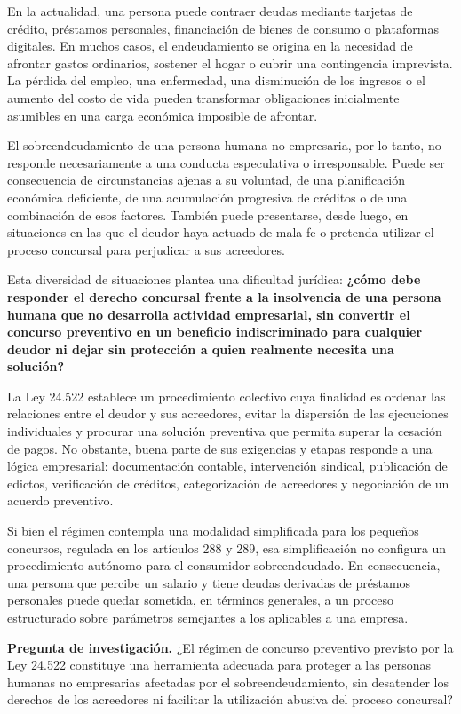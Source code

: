 \documentclass[12pt,oneside]{book}
\begin{document}
En la actualidad, una persona puede contraer deudas mediante tarjetas de crédito, préstamos personales, financiación de bienes de consumo o plataformas digitales. En muchos casos, el endeudamiento se origina en la necesidad de afrontar gastos ordinarios, sostener el hogar o cubrir una contingencia imprevista. La pérdida del empleo, una enfermedad, una disminución de los ingresos o el aumento del costo de vida pueden transformar obligaciones inicialmente asumibles en una carga económica imposible de afrontar.

El sobreendeudamiento de una persona humana no empresaria, por lo tanto, no responde necesariamente a una conducta especulativa o irresponsable. Puede ser consecuencia de circunstancias ajenas a su voluntad, de una planificación económica deficiente, de una acumulación progresiva de créditos o de una combinación de esos factores. También puede presentarse, desde luego, en situaciones en las que el deudor haya actuado de mala fe o pretenda utilizar el proceso concursal para perjudicar a sus acreedores.

Esta diversidad de situaciones plantea una dificultad jurídica: \textbf{¿cómo debe responder el derecho concursal frente a la insolvencia de una persona humana que no desarrolla actividad empresarial, sin convertir el concurso preventivo en un beneficio indiscriminado para cualquier deudor ni dejar sin protección a quien realmente necesita una solución?}

La Ley 24.522 establece un procedimiento colectivo cuya finalidad es ordenar las relaciones entre el deudor y sus acreedores, evitar la dispersión de las ejecuciones individuales y procurar una solución preventiva que permita superar la cesación de pagos. No obstante, buena parte de sus exigencias y etapas responde a una lógica empresarial: documentación contable, intervención sindical, publicación de edictos, verificación de créditos, categorización de acreedores y negociación de un acuerdo preventivo.

Si bien el régimen contempla una modalidad simplificada para los pequeños concursos, regulada en los artículos 288 y 289, esa simplificación no configura un procedimiento autónomo para el consumidor sobreendeudado. En consecuencia, una persona que percibe un salario y tiene deudas derivadas de préstamos personales puede quedar sometida, en términos generales, a un proceso estructurado sobre parámetros semejantes a los aplicables a una empresa.

\begin{important}
\textbf{Pregunta de investigación.} ¿El régimen de concurso preventivo previsto por la Ley 24.522 constituye una herramienta adecuada para proteger a las personas humanas no empresarias afectadas por el sobreendeudamiento, sin desatender los derechos de los acreedores ni facilitar la utilización abusiva del proceso concursal?
\end{important}
\end{document}
